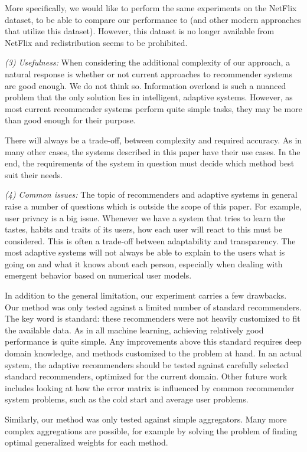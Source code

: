More specifically, we would like to perform the same experiments on the NetFlix dataset,
to be able to compare our performance to \cite{Bell2007}
(and other modern approaches that utilize this dataset).
However, this dataset is no longer available from NetFlix and 
redistribution seems to be prohibited.

\emph{(3) Usefulness:}
When considering the additional complexity of our approach,
a natural response is whether or not current approaches
to recommender systems are good enough.
We do not think so. Information overload is such a nuanced problem 
that the only solution lies in intelligent, adaptive systems.
However, as most current recommender systems 
perform quite simple tasks, they may be more
than good enough for their purpose.

There will always be a trade-off, between complexity and required accuracy.
As in many other cases, the systems described in this paper
have their use cases. In the end, the requirements of the system in question
must decide which method best suit their needs.

\emph{(4) Common issues:}
The topic of recommenders and adaptive systems in general
raise a number of questions which is outside the scope of this paper.
For example, user privacy is a big issue.
Whenever we have a system that tries to learn the tastes, habits and
traits of its users, how each user will react to this must be considered.
This is often a trade-off between adaptability and transparency.
The most adaptive systems will not always be able to explain to the users
what is going on and what it knows about each person,
especially when dealing with emergent behavior based on 
numerical user models.

In addition to the general limitation, our experiment carries a few drawbacks.
Our method was only tested against a limited number of standard recommenders.
The key word is standard: these recommenders were not heavily customized
to fit the available data. As in all machine learning,
achieving relatively good performance is quite simple.
Any improvements above this standard requires deep domain knowledge,
and methods customized to the problem at hand.
In an actual system, the adaptive recommenders should be tested
against carefully selected standard recommenders,
optimized for the current domain.
Other future work includes looking at how the error matrix
is influenced by common recommender system problems,
such as the cold start and average user problems.


Similarly, our method was only tested against simple aggregators.
Many more complex aggregations are possible,
for example by solving the problem of finding
optimal generalized weights for each method.


